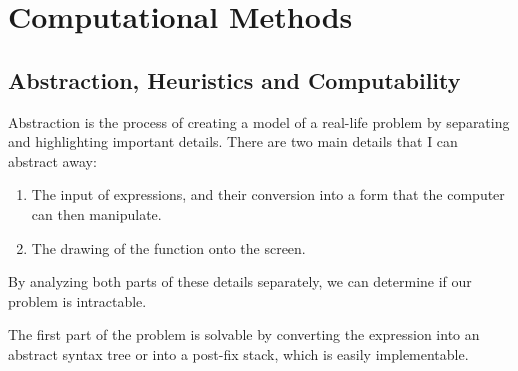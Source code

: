 \documentclass[../../../main.tex]{subfiles}
\begin{document}
\chapter{Computational Methods}

\section{Abstraction, Heuristics and Computability}
Abstraction is the process of creating a model of a real-life problem by separating and highlighting important details. There are two main details that I can abstract away:
\begin{enumerate}
\item The input of expressions, and their conversion into a form that the computer can then manipulate.
\item The drawing of the function onto the screen.
\end{enumerate}
By analyzing both parts of these details separately, we can determine if our problem is intractable.

The first part of the problem is solvable by converting the expression into an abstract syntax tree or into a post-fix stack, which is easily implementable.
\end{document}
